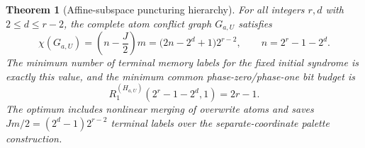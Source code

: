 \documentclass[11pt,a4paper]{article}
\newtheorem{theorem}{Theorem}[section]
\begin{document}
\begin{theorem}[Affine-subspace puncturing hierarchy]\label{thm:plane-exact}
For all integers $r,d$ with $2\le d\le r-2$, the complete atom conflict
graph $G_{a,U}$ satisfies
\begin{equation}\label{eq:plane-exact}
 \boxed{\quad
 \chi(G_{a,U})=\left(n-\frac J2\right)m
 =\bigl(2n-2^d+1\bigr)2^{r-2},
 \qquad n=2^r-1-2^d.\quad}
\end{equation}
The minimum number of terminal memory labels for the fixed initial
syndrome is exactly this value, and the minimum common phase-zero/phase-one
bit budget is
\begin{equation}\label{eq:plane-bits}
 \boxed{\quad R_1^{(H_{a,U})}(2^r-1-2^d,1)=2r-1.\quad}
\end{equation}
The optimum includes nonlinear merging of overwrite atoms and
saves $Jm/2=(2^d-1)2^{r-2}$ terminal labels over the separate-coordinate
palette construction.
\end{theorem}
\end{document}
